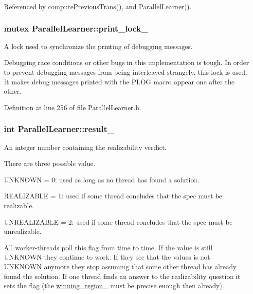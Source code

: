 Referenced by compute\-Previous\-Trans(), and Parallel\-Learner().

\hypertarget{classParallelLearner_a5bc71a2c35fa976d792bf0e80de31a39}{
\subsubsection[{print\-\_\-lock\-\_\-}]{\setlength{\rightskip}{0pt plus 5cm}mutex Parallel\-Learner\-::print\-\_\-lock\-\_\-\hspace{0.3cm}{\ttfamily [static]}}}\label{classParallelLearner_a5bc71a2c35fa976d792bf0e80de31a39}


A lock used to synchronize the printing of debugging messages. 

Debugging race conditions or other bugs in this implementation is tough. In order to prevent debugging messages from being interleaved strangely, this lock is used. It makes debug messages printed with the P\-L\-O\-G macro appear one after the other. 

Definition at line 256 of file Parallel\-Learner.\-h.

\hypertarget{classParallelLearner_a757f8817809cce5c0408cdc41d6db1b8}{
\subsubsection[{result\-\_\-}]{\setlength{\rightskip}{0pt plus 5cm}int Parallel\-Learner\-::result\-\_\-}}\label{classParallelLearner_a757f8817809cce5c0408cdc41d6db1b8}


An integer number containing the realizability verdict. 

There are three possible value. 
\begin{DoxyItemize}
\item U\-N\-K\-N\-O\-W\-N = 0\-: used as long as no thread has found a solution. 
\item R\-E\-A\-L\-I\-Z\-A\-B\-L\-E = 1\-: used if some thread concludes that the spec must be realizable. 
\item U\-N\-R\-E\-A\-L\-I\-Z\-A\-B\-L\-E = 2\-: used if some thread concludes that the spec must be unrealizable. 
\end{DoxyItemize}All worker-\/threads poll this flag from time to time. If the value is still U\-N\-K\-N\-O\-W\-N they continue to work. If they see that the values is not U\-N\-K\-N\-O\-W\-N anymore they stop assuming that some other thread has already found the solution. If one thread finds an answer to the realizability question it sets the flag (the \hyperlink{classParallelLearner_a7c8383543ff98d7a0356a237756dcdd6}{winning\-\_\-region\-\_\-} must be precise enough then already). 

